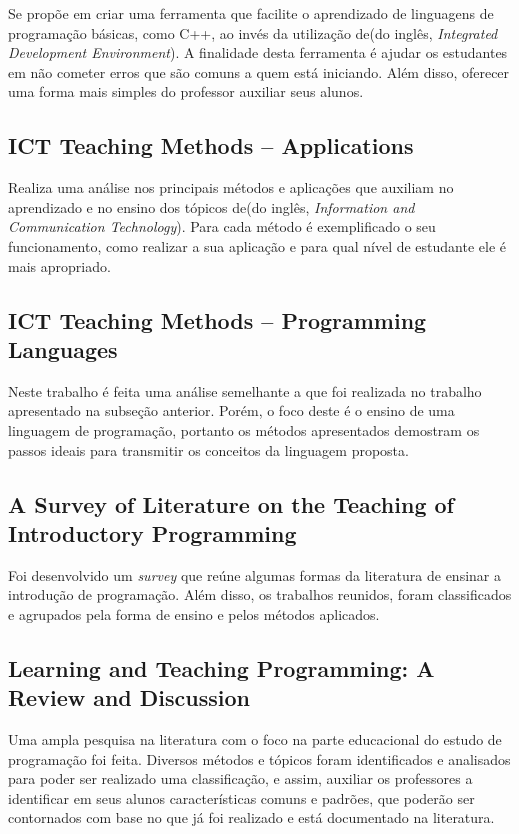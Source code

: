 Se propõe em criar uma ferramenta que facilite o aprendizado de linguagens de programação básicas, como C++, ao invés da utilização de(do inglês, \textit{Integrated Development Environment}). A finalidade desta ferramenta é ajudar os estudantes em não cometer erros que são comuns a quem está iniciando. Além disso, oferecer uma forma mais simples do professor auxiliar seus alunos.

\subsection{ICT Teaching Methods – Applications} \nocite{teachingapplications}

Realiza uma análise nos principais métodos e aplicações que auxiliam no aprendizado e no ensino dos tópicos de(do inglês, \textit{Information and Communication Technology}). Para cada método é exemplificado o seu funcionamento, como realizar a sua aplicação e para qual nível de estudante ele é mais apropriado. 


\subsection{ICT Teaching Methods – Programming Languages} \nocite{teachingapplicationslanguages}

Neste trabalho é feita uma análise semelhante a que foi realizada no trabalho apresentado na subseção anterior. Porém, o foco deste é o ensino de uma linguagem de programação, portanto os métodos apresentados demostram os passos ideais para transmitir os conceitos da linguagem proposta.

\subsection{A Survey of Literature on the Teaching of Introductory Programming} \nocite{Pears:2007:SLT:1345443.1345441}
 Foi desenvolvido um \textit{survey} que reúne algumas formas da literatura de ensinar a introdução de programação. Além disso, os trabalhos reunidos, foram classificados e agrupados pela forma de ensino e pelos métodos aplicados.

\subsection{Learning and Teaching Programming: A Review	and Discussion} \nocite{doi:10.1076/csed.13.2.137.14200} 
Uma ampla pesquisa na literatura com o foco na parte educacional do estudo de programação foi feita. Diversos métodos e tópicos foram identificados e analisados para poder ser realizado uma classificação, e assim, auxiliar os professores a identificar em seus alunos características comuns e padrões, que poderão ser contornados com base no que já foi realizado e está documentado na literatura.

